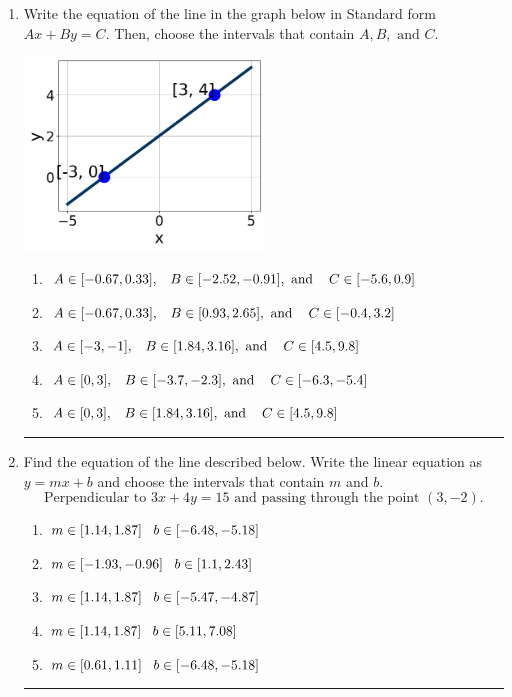 \documentclass[14pt]{extbook}
\newcommand{\litem}[1]{\item#1\hspace*{-1cm}\rule{\textwidth}{0.4pt}}
\begin{document}
\begin{enumerate}
\litem{
Write the equation of the line in the graph below in Standard form $Ax+By=C$. Then, choose the intervals that contain $A, B, \text{ and } C$.
\begin{center}
    \includegraphics[width=0.5\textwidth]{../Figures/linearGraphToStandardA.png}
\end{center}
\begin{enumerate}[label=\Alph*.]
\item \( A \in [-0.67, 0.33], \hspace{3mm} B \in [-2.52, -0.91], \text{ and } \hspace{3mm} C \in [-5.6, 0.9] \)
\item \( A \in [-0.67, 0.33], \hspace{3mm} B \in [0.93, 2.65], \text{ and } \hspace{3mm} C \in [-0.4, 3.2] \)
\item \( A \in [-3, -1], \hspace{3mm} B \in [1.84, 3.16], \text{ and } \hspace{3mm} C \in [4.5, 9.8] \)
\item \( A \in [0, 3], \hspace{3mm} B \in [-3.7, -2.3], \text{ and } \hspace{3mm} C \in [-6.3, -5.4] \)
\item \( A \in [0, 3], \hspace{3mm} B \in [1.84, 3.16], \text{ and } \hspace{3mm} C \in [4.5, 9.8] \)

\end{enumerate} }
\litem{
Find the equation of the line described below. Write the linear equation as $ y=mx+b $ and choose the intervals that contain $m$ and $b$.\[ \text{Perpendicular to } 3 x + 4 y = 15 \text{ and passing through the point } (3, -2). \]\begin{enumerate}[label=\Alph*.]
\item \( m \in [1.14, 1.87] \hspace*{3mm} b \in [-6.48, -5.18] \)
\item \( m \in [-1.93, -0.96] \hspace*{3mm} b \in [1.1, 2.43] \)
\item \( m \in [1.14, 1.87] \hspace*{3mm} b \in [-5.47, -4.87] \)
\item \( m \in [1.14, 1.87] \hspace*{3mm} b \in [5.11, 7.08] \)
\item \( m \in [0.61, 1.11] \hspace*{3mm} b \in [-6.48, -5.18] \)


\end{enumerate}}
\end{enumerate}
\end{document}
